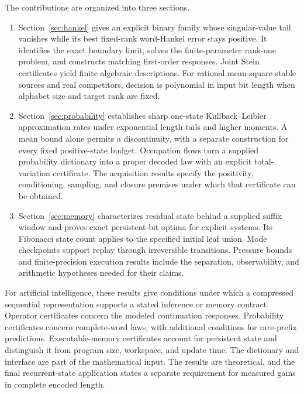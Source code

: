 The contributions are organized into three sections.
{
\begin{enumerate}[label=(\roman*)]
\item \begin{samepage}Section~\ref{sec:hankel} gives an explicit binary family whose
singular-value tail vanishes while its best fixed-rank word-Hankel error
stays positive. It identifies the exact boundary limit, solves the
finite-parameter rank-one problem, and constructs matching first-order
responses. Joint Stein certificates yield finite algebraic descriptions.
For rational mean-square-stable sources and real competitors, decision
is polynomial in input bit length when alphabet size and target rank
are fixed.
\end{samepage}
\item \begin{samepage}Section~\ref{sec:probability} establishes sharp one-state
Kullback--Leibler approximation rates under exponential length tails
and higher moments. A mean bound alone permits a discontinuity, with a
separate construction for every fixed positive-state budget. Occupation
flows turn a supplied probability dictionary into a proper decoded law
with an explicit total-variation certificate. The acquisition results
specify the positivity, conditioning, sampling, and closure premises
under which that certificate can be obtained.
\end{samepage}
\item \begin{samepage}Section~\ref{sec:memory} characterizes residual state behind a
supplied suffix window and proves exact persistent-bit optima for
explicit systems. Its Fibonacci state count applies to the specified
initial leaf union. Mode checkpoints support replay through irreversible
transitions. Pressure bounds and finite-precision execution results
include the separation, observability, and arithmetic hypotheses needed
for their claims.
\end{samepage}
\end{enumerate}}

For artificial intelligence, these results give conditions under which a
compressed sequential representation supports a stated inference or
memory contract. Operator certificates concern the modeled continuation
responses. Probability certificates concern complete-word laws, with
additional conditions for rare-prefix predictions. Executable-memory
certificates account for persistent state and distinguish it from program
size, workspace, and update time. The dictionary and interface are part of
the mathematical input. The results are theoretical, and the final
recurrent-state application states a separate requirement for measured
gains in complete encoded length.

